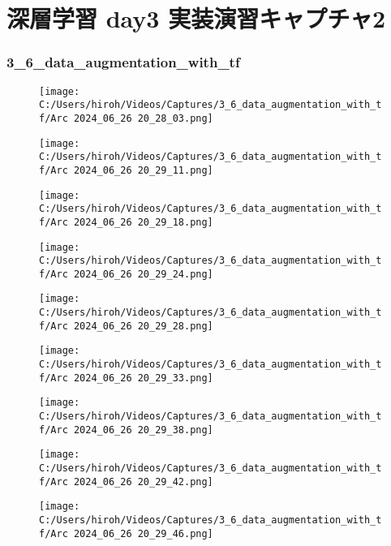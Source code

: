 \documentclass{ltjsarticle}
\begin{document}
\part{深層学習 day3 実装演習キャプチャ2}

\section{3\_6\_data\_augmentation\_with\_tf}
\begin{figure}[htbp]
  \centering
  \texttt{[image: C:/Users/hiroh/Videos/Captures/3\_6\_data\_augmentation\_with\_tf/Arc 2024\_06\_26 20\_28\_03.png]}
\end{figure}
\begin{figure}[htbp]
  \centering
  \texttt{[image: C:/Users/hiroh/Videos/Captures/3\_6\_data\_augmentation\_with\_tf/Arc 2024\_06\_26 20\_29\_11.png]}
\end{figure}
\begin{figure}[htbp]
  \centering
  \texttt{[image: C:/Users/hiroh/Videos/Captures/3\_6\_data\_augmentation\_with\_tf/Arc 2024\_06\_26 20\_29\_18.png]}
\end{figure}
\begin{figure}[htbp]
  \centering
  \texttt{[image: C:/Users/hiroh/Videos/Captures/3\_6\_data\_augmentation\_with\_tf/Arc 2024\_06\_26 20\_29\_24.png]}
\end{figure}
\begin{figure}[htbp]
  \centering
  \texttt{[image: C:/Users/hiroh/Videos/Captures/3\_6\_data\_augmentation\_with\_tf/Arc 2024\_06\_26 20\_29\_28.png]}
\end{figure}
\begin{figure}[htbp]
  \centering
  \texttt{[image: C:/Users/hiroh/Videos/Captures/3\_6\_data\_augmentation\_with\_tf/Arc 2024\_06\_26 20\_29\_33.png]}
\end{figure}
\begin{figure}[htbp]
  \centering
  \texttt{[image: C:/Users/hiroh/Videos/Captures/3\_6\_data\_augmentation\_with\_tf/Arc 2024\_06\_26 20\_29\_38.png]}
\end{figure}
\begin{figure}[htbp]
  \centering
  \texttt{[image: C:/Users/hiroh/Videos/Captures/3\_6\_data\_augmentation\_with\_tf/Arc 2024\_06\_26 20\_29\_42.png]}
\end{figure}
\begin{figure}[htbp]
  \centering
  \texttt{[image: C:/Users/hiroh/Videos/Captures/3\_6\_data\_augmentation\_with\_tf/Arc 2024\_06\_26 20\_29\_46.png]}
\end{figure}
\end{document}
